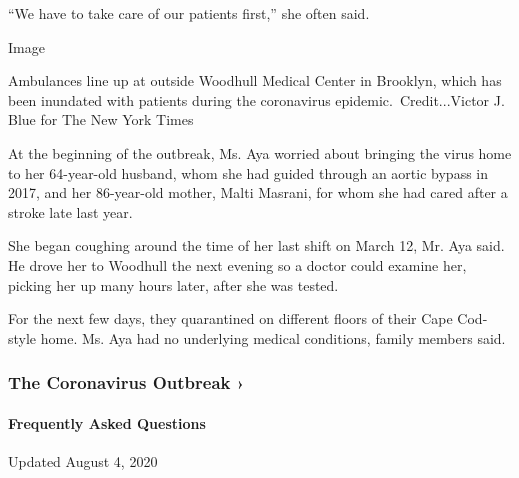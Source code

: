 ``We have to take care of our patients first,'' she often said.

Image

Ambulances line up at outside Woodhull Medical Center in Brooklyn, which
has been inundated with patients during the coronavirus
epidemic.~Credit...Victor J. Blue for The New York Times

At the beginning of the outbreak, Ms. Aya worried about bringing the
virus home to her 64-year-old husband, whom she had guided through an
aortic bypass in 2017, and her 86-year-old mother, Malti Masrani, for
whom she had cared after a stroke late last year.

She began coughing around the time of her last shift on March 12, Mr.
Aya said. He drove her to Woodhull the next evening so a doctor could
examine her, picking her up many hours later, after she was tested.

For the next few days, they quarantined on different floors of their
Cape Cod-style home. Ms. Aya had no underlying medical conditions,
family members said.

\href{https://www.nytimes.com/news-event/coronavirus?action=click\&pgtype=Article\&state=default\&region=MAIN_CONTENT_3\&context=storylines_faq}{}

\hypertarget{the-coronavirus-outbreak-}{%
\subsubsection{The Coronavirus Outbreak
›}\label{the-coronavirus-outbreak-}}

\hypertarget{frequently-asked-questions}{%
\paragraph{Frequently Asked
Questions}\label{frequently-asked-questions}}

Updated August 4, 2020

